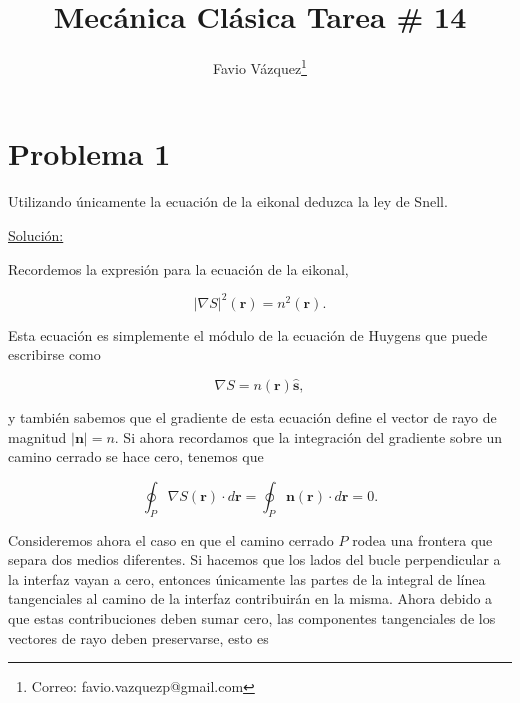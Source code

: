 \documentclass[a4paper,10pt]{article}
\title{Mecánica Clásica Tarea \# 14}
\author{Favio Vázquez\thanks{Correo: favio.vazquezp@gmail.com}}\affil{Instituto de Ciencias Nucleares. Universidad Nacional Autónoma de México.}
\date{}
\numberwithin{equation}{section}
\begin{document}
\makeatletter
\def\@maketitle{%
  \newpage
  \null
  \vskip 2em%
  \begin{center}%
  \let \footnote \thanks
    {\Large\bfseries \@title \par}%
    \vskip 1.5em%
    {\normalsize
      \lineskip .5em%
      \begin{tabular}[t]{c}%
        \@author
      \end{tabular}\par}%
    \vskip 1em%
    {\normalsize \@date}%
  \end{center}%
  \par
  \vskip 1.5em}
\makeatother

\maketitle

\section{Problema 1}

Utilizando únicamente la ecuación de la eikonal deduzca la ley de Snell.

\vspace{.3cm}

\underline{Solución:} \vspace{.3cm}

Recordemos la expresión para la ecuación de la eikonal,

\begin{equation}
 |\nabla S|^2(\mathbf{r}) = n^2(\mathbf{r}).
\end{equation}

Esta ecuación es simplemente el módulo de la ecuación de Huygens que puede 
escribirse como 

\begin{equation}
 \nabla S = n(\mathbf{r})\hat{\mathbf{s}},
\end{equation}

y también sabemos que el gradiente de esta ecuación define el vector de rayo de 
magnitud $|\mathbf{n}| = n$. Si ahora recordamos que la integración del gradiente 
sobre un camino cerrado se hace cero, tenemos que 

\begin{equation}
\oint_P \nabla S(\mathbf{r}) \cdot d\mathbf{r} = \oint_P \mathbf{n}(\mathbf{r}) 
\cdot d\mathbf{r} = 0.
\end{equation}

Consideremos ahora el caso en que el camino cerrado $P$ rodea una frontera que 
separa dos medios diferentes. Si hacemos que los lados del bucle perpendicular 
a la interfaz vayan a cero, entonces únicamente las partes de la integral de línea 
tangenciales al camino de la interfaz contribuirán en la misma. Ahora debido a que 
estas contribuciones deben sumar cero, las componentes tangenciales de los vectores 
de rayo deben preservarse, esto es 
\end{document}
